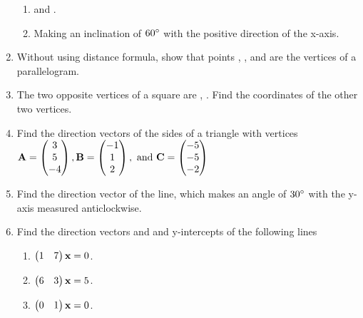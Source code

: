 \documentclass[journal,12pt,twocolumn]{IEEEtran}
\renewcommand\thesection{\arabic{section}}
\begin{document}
\begin{enumerate}[label=\thesection.\arabic*.,ref=\thesection.\theenumi]
\begin{enumerate}
\item {} and .
\item Making an inclination of $60\degree$ with the positive direction of the x-axis.
\end{enumerate}
%
\solution

\item Without using distance formula, show that points , ,  and  are the vertices of a parallelogram.
\\
\solution

%
\item The two opposite vertices of a square are ,  . Find the coordinates of the other two vertices.
\\
\solution

%

\item Find the direction vectors of the sides of a triangle with vertices
$
\mathbf{A} = \begin{pmatrix}3\\5 \\-4\end{pmatrix},
\mathbf{B} = \begin{pmatrix}-1\\1 \\2\end{pmatrix}, \text{ and }
\mathbf{C} = \begin{pmatrix}-5\\ -5\\-2\end{pmatrix}
$
\\
\solution
%
\item Find the direction vector of the line, which makes an angle of $30\degree$ with the y-axis measured anticlockwise.


\item Find the direction vectors and and y-intercepts  of the following lines 
\begin{enumerate}
\item $\begin{pmatrix}1 & 7\end{pmatrix}\mathbf{x} = 0$.
\item $\begin{pmatrix}6 & 3\end{pmatrix}\mathbf{x} = 5$.
\item $\begin{pmatrix}0 & 1\end{pmatrix}\mathbf{x} = 0$.
\end{enumerate}
\end{enumerate}
\end{document}
